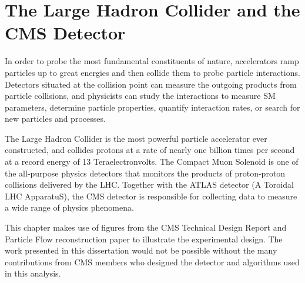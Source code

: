 \chapter{The Large Hadron Collider and the CMS Detector}
\label{ch:detector}

In order to probe the most fundamental constituents of nature, accelerators ramp particles up to great energies and then collide them to probe particle interactions. Detectors situated at the collision point can measure the outgoing products from particle collisions, and physicists can study the interactions to measure SM parameters, determine particle properties, quantify interaction rates, or search for new particles and processes.

The Large Hadron Collider is the most powerful particle accelerator ever constructed, and collides protons at a rate of nearly one billion times per second at a record energy of 13 Teraelectronvolts. The Compact Muon Solenoid is one of the all-purpose physics detectors that monitors the products of proton-proton collisions delivered by the LHC. Together with the ATLAS detector (A Toroidal LHC ApparatuS), the CMS detector is responsible for collecting data to measure a wide range of physics phenomena.





This chapter makes use of figures from the CMS Technical Design Report and Particle Flow reconstruction paper to illustrate the experimental design. The work presented in this dissertation would not be possible without the many contributions from CMS members who designed the detector and algorithms used in this analysis.

